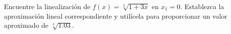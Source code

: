 \item Encuentre la linealización de $f(x) = \sqrt[3]{1 + 3x}$ en $x_1 = 0$. Establezca la aproximación lineal correspondiente y utilícela para proporcionar un valor aproximado de $\sqrt[3]{1.03}$.
